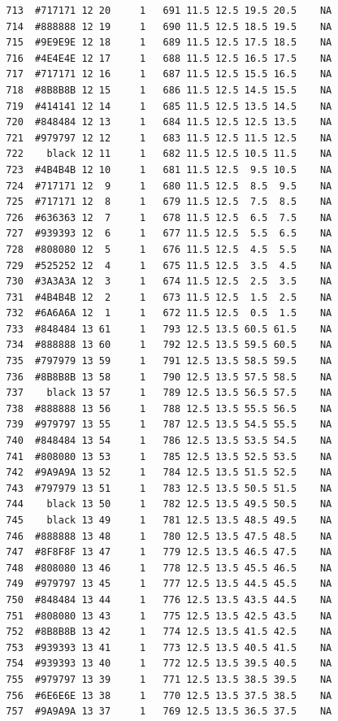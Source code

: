 \documentclass[12pt,twoside]{reedthesis}
\begin{document}
\begin{verbatim}
  713  #717171 12 20     1   691 11.5 12.5 19.5 20.5    NA
  714  #888888 12 19     1   690 11.5 12.5 18.5 19.5    NA
  715  #9E9E9E 12 18     1   689 11.5 12.5 17.5 18.5    NA
  716  #4E4E4E 12 17     1   688 11.5 12.5 16.5 17.5    NA
  717  #717171 12 16     1   687 11.5 12.5 15.5 16.5    NA
  718  #8B8B8B 12 15     1   686 11.5 12.5 14.5 15.5    NA
  719  #414141 12 14     1   685 11.5 12.5 13.5 14.5    NA
  720  #848484 12 13     1   684 11.5 12.5 12.5 13.5    NA
  721  #979797 12 12     1   683 11.5 12.5 11.5 12.5    NA
  722    black 12 11     1   682 11.5 12.5 10.5 11.5    NA
  723  #4B4B4B 12 10     1   681 11.5 12.5  9.5 10.5    NA
  724  #717171 12  9     1   680 11.5 12.5  8.5  9.5    NA
  725  #717171 12  8     1   679 11.5 12.5  7.5  8.5    NA
  726  #636363 12  7     1   678 11.5 12.5  6.5  7.5    NA
  727  #939393 12  6     1   677 11.5 12.5  5.5  6.5    NA
  728  #808080 12  5     1   676 11.5 12.5  4.5  5.5    NA
  729  #525252 12  4     1   675 11.5 12.5  3.5  4.5    NA
  730  #3A3A3A 12  3     1   674 11.5 12.5  2.5  3.5    NA
  731  #4B4B4B 12  2     1   673 11.5 12.5  1.5  2.5    NA
  732  #6A6A6A 12  1     1   672 11.5 12.5  0.5  1.5    NA
  733  #848484 13 61     1   793 12.5 13.5 60.5 61.5    NA
  734  #888888 13 60     1   792 12.5 13.5 59.5 60.5    NA
  735  #797979 13 59     1   791 12.5 13.5 58.5 59.5    NA
  736  #8B8B8B 13 58     1   790 12.5 13.5 57.5 58.5    NA
  737    black 13 57     1   789 12.5 13.5 56.5 57.5    NA
  738  #888888 13 56     1   788 12.5 13.5 55.5 56.5    NA
  739  #979797 13 55     1   787 12.5 13.5 54.5 55.5    NA
  740  #848484 13 54     1   786 12.5 13.5 53.5 54.5    NA
  741  #808080 13 53     1   785 12.5 13.5 52.5 53.5    NA
  742  #9A9A9A 13 52     1   784 12.5 13.5 51.5 52.5    NA
  743  #797979 13 51     1   783 12.5 13.5 50.5 51.5    NA
  744    black 13 50     1   782 12.5 13.5 49.5 50.5    NA
  745    black 13 49     1   781 12.5 13.5 48.5 49.5    NA
  746  #888888 13 48     1   780 12.5 13.5 47.5 48.5    NA
  747  #8F8F8F 13 47     1   779 12.5 13.5 46.5 47.5    NA
  748  #808080 13 46     1   778 12.5 13.5 45.5 46.5    NA
  749  #979797 13 45     1   777 12.5 13.5 44.5 45.5    NA
  750  #848484 13 44     1   776 12.5 13.5 43.5 44.5    NA
  751  #808080 13 43     1   775 12.5 13.5 42.5 43.5    NA
  752  #8B8B8B 13 42     1   774 12.5 13.5 41.5 42.5    NA
  753  #939393 13 41     1   773 12.5 13.5 40.5 41.5    NA
  754  #939393 13 40     1   772 12.5 13.5 39.5 40.5    NA
  755  #979797 13 39     1   771 12.5 13.5 38.5 39.5    NA
  756  #6E6E6E 13 38     1   770 12.5 13.5 37.5 38.5    NA
  757  #9A9A9A 13 37     1   769 12.5 13.5 36.5 37.5    NA

\end{verbatim}
\end{document}
